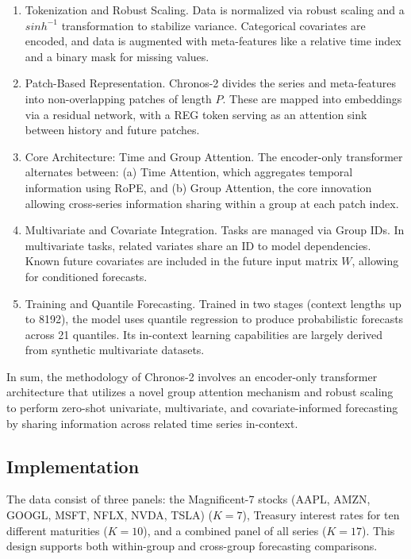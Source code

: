 \documentclass[twocolumn]{article}
\begin{document}
\begin{enumerate}
\item Tokenization and Robust Scaling. Data is normalized via robust scaling and a $sinh^{-1}$ transformation to stabilize variance. Categorical covariates are encoded, and data is augmented with meta-features like a relative time index and a binary mask for missing values.
\item Patch-Based Representation. Chronos-2 divides the series and meta-features into non-overlapping patches of length $P$. These are mapped into embeddings via a residual network, with a REG token serving as an attention sink between history and future patches.
\item Core Architecture: Time and Group Attention. The encoder-only transformer alternates between: (a) Time Attention, which aggregates temporal information using RoPE, and (b) Group Attention, the core innovation allowing cross-series information sharing within a group at each patch index.
\item Multivariate and Covariate Integration. Tasks are managed via Group IDs. In multivariate tasks, related variates share an ID to model dependencies. Known future covariates are included in the future input matrix $W$, allowing for conditioned forecasts.
\item Training and Quantile Forecasting. Trained in two stages (context lengths up to 8192), the model uses quantile regression to produce probabilistic forecasts across 21 quantiles. Its in-context learning capabilities are largely derived from synthetic multivariate datasets.
\end{enumerate}

In sum, the methodology of Chronos-2 involves an encoder-only transformer architecture that utilizes a novel group attention mechanism and robust scaling to perform zero-shot univariate, multivariate, and covariate-informed forecasting by sharing information across related time series in-context.

\subsection{Implementation}

The data consist of three panels: the Magnificent-7 stocks (AAPL, AMZN, GOOGL, MSFT, NFLX, NVDA, TSLA) ($K=7$), Treasury interest rates for ten different maturities ($K=10$), and a combined panel of all series ($K=17$). This design supports both within-group and cross-group forecasting comparisons.
\end{document}
